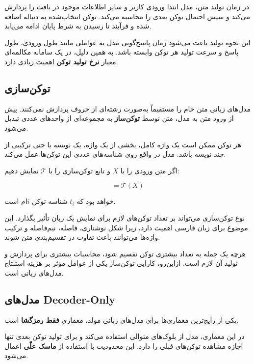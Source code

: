 در زمان تولید متن، مدل ابتدا ورودی کاربر و سایر اطلاعات موجود
در بافت را پردازش می‌کند و سپس احتمال توکن بعدی را محاسبه
می‌کند.
توکن انتخاب‌شده به دنباله اضافه شده و فرآیند تا رسیدن به
شرط پایان ادامه می‌یابد.

این نحوه تولید باعث می‌شود زمان پاسخ‌گویی مدل به عواملی مانند
طول ورودی، طول پاسخ و سرعت تولید هر توکن وابسته باشد.
به همین دلیل، در یک سامانه مکالمه‌ای معیار
\textbf{نرخ تولید توکن}
اهمیت زیادی دارد.


\subsection{توکن‌سازی}

مدل‌های زبانی متن خام را مستقیماً به‌صورت رشته‌ای از حروف
پردازش نمی‌کنند.
پیش از ورود متن به مدل، متن توسط
\textbf{توکن‌ساز}
به مجموعه‌ای از واحدهای عددی تبدیل می‌شود.

هر توکن ممکن است یک واژه کامل، بخشی از یک واژه، یک نویسه
یا حتی ترکیبی از چند نویسه باشد.
مدل در واقع روی شناسه‌های عددی این توکن‌ها عمل می‌کند.

اگر متن ورودی را با $X$ و تابع توکن‌سازی را با
$\mathcal{T}$ نمایش دهیم:

\begin{equation}
[t_1,t_2,\ldots,t_n]
=
\mathcal{T}(X)
\end{equation}

خواهد بود که $t_i$ شناسه توکن $i$ام است.

نوع توکن‌سازی می‌تواند بر تعداد توکن‌های لازم برای نمایش یک
زبان تأثیر بگذارد.
این موضوع برای زبان فارسی اهمیت دارد، زیرا شکل نوشتاری،
فاصله، نیم‌فاصله و ترکیب واژه‌ها می‌توانند باعث تفاوت در
تقسیم‌بندی متن شوند.

هرچه یک جمله به تعداد بیشتری توکن تقسیم شود، محاسبات بیشتری
برای پردازش و تولید آن لازم است.
ازاین‌رو، کارایی توکن‌ساز یکی از عوامل مؤثر بر هزینه استنتاج
مدل‌های زبانی است.


\subsection{مدل‌های Decoder-Only}

یکی از رایج‌ترین معماری‌ها برای مدل‌های زبانی مولد،
معماری
\textbf{فقط رمزگشا}
است.

در این معماری، مدل از بلوک‌های متوالی  استفاده
می‌کند و برای تولید توکن بعدی تنها اجازه مشاهده توکن‌های قبلی
را دارد.
این محدودیت با استفاده از
\textbf{ماسک علّی}
اعمال می‌شود.

